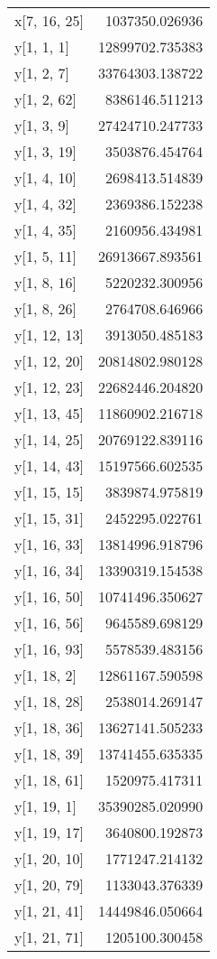 \begin{longtable}{lr}
x[7, 16, 25] & 1037350.026936 \\
y[1, 1, 1] & 12899702.735383 \\
y[1, 2, 7] & 33764303.138722 \\
y[1, 2, 62] & 8386146.511213 \\
y[1, 3, 9] & 27424710.247733 \\
y[1, 3, 19] & 3503876.454764 \\
y[1, 4, 10] & 2698413.514839 \\
y[1, 4, 32] & 2369386.152238 \\
y[1, 4, 35] & 2160956.434981 \\
y[1, 5, 11] & 26913667.893561 \\
y[1, 8, 16] & 5220232.300956 \\
y[1, 8, 26] & 2764708.646966 \\
y[1, 12, 13] & 3913050.485183 \\
y[1, 12, 20] & 20814802.980128 \\
y[1, 12, 23] & 22682446.204820 \\
y[1, 13, 45] & 11860902.216718 \\
y[1, 14, 25] & 20769122.839116 \\
y[1, 14, 43] & 15197566.602535 \\
y[1, 15, 15] & 3839874.975819 \\
y[1, 15, 31] & 2452295.022761 \\
y[1, 16, 33] & 13814996.918796 \\
y[1, 16, 34] & 13390319.154538 \\
y[1, 16, 50] & 10741496.350627 \\
y[1, 16, 56] & 9645589.698129 \\
y[1, 16, 93] & 5578539.483156 \\
y[1, 18, 2] & 12861167.590598 \\
y[1, 18, 28] & 2538014.269147 \\
y[1, 18, 36] & 13627141.505233 \\
y[1, 18, 39] & 13741455.635335 \\
y[1, 18, 61] & 1520975.417311 \\
y[1, 19, 1] & 35390285.020990 \\
y[1, 19, 17] & 3640800.192873 \\
y[1, 20, 10] & 1771247.214132 \\
y[1, 20, 79] & 1133043.376339 \\
y[1, 21, 41] & 14449846.050664 \\
y[1, 21, 71] & 1205100.300458 \\

\end{longtable}
